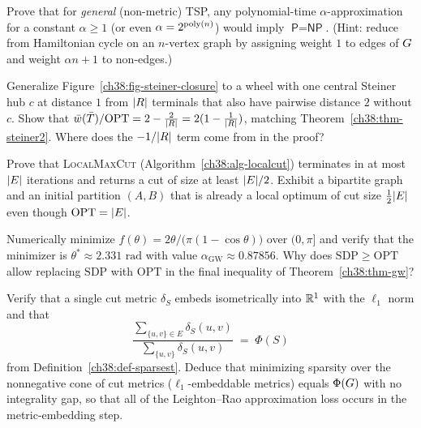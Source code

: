 \begin{exercise}\label{ch38:ex-tsp-nonmetric}
Prove that for \emph{general} (non-metric) TSP, any polynomial-time $\alpha$-approximation for a constant
$\alpha \ge 1$ (or even $\alpha = 2^{\operatorname{poly}(n)}$) would imply $\textsf{P}=\textsf{NP}$. (Hint: reduce from
Hamiltonian cycle on an $n$-vertex graph by assigning weight $1$ to edges of $G$ and weight $\alpha n + 1$
to non-edges.)
\end{exercise}

\begin{exercise}\label{ch38:ex-steiner-gap}
Generalize Figure~\ref{ch38:fig-steiner-closure} to a wheel with one central Steiner hub $c$ at distance $1$
from $\lvert R\rvert$ terminals that also have pairwise distance $2$ without $c$. Show that $\bar w(\bar T)/\mathrm{OPT}
= 2 - \tfrac{2}{\lvert R\rvert} = 2(1 - \tfrac{1}{\lvert R\rvert})$, matching Theorem~\ref{ch38:thm-steiner2}. Where does the
$-1/\lvert R\rvert$ term come from in the proof?
\end{exercise}

\begin{exercise}\label{ch38:ex-maxcut-half}
Prove that \textsc{LocalMaxCut} (Algorithm~\ref{ch38:alg-localcut}) terminates in at most $\lvert E\rvert$
iterations and returns a cut of size at least $\lvert E\rvert/2$. Exhibit a bipartite graph and an initial partition
$(A,B)$ that is already a local optimum of cut size $\tfrac12\lvert E\rvert$ even though $\mathrm{OPT}=\lvert E\rvert$.
\end{exercise}

\begin{exercise}\label{ch38:ex-gw-curve}
Numerically minimize $f(\theta)=2\theta/\bigl(\pi(1-\cos\theta)\bigr)$ over $(0,\pi]$ and verify that the
minimizer is $\theta^\ast\approx 2.331\text{ rad}$ with value $\alpha_{\mathrm{GW}}\approx 0.87856$. Why
does $\mathrm{SDP}\ge\mathrm{OPT}$ allow replacing $\mathrm{SDP}$ with $\mathrm{OPT}$ in the final inequality
of Theorem~\ref{ch38:thm-gw}?
\end{exercise}

\begin{exercise}\label{ch38:ex-cut-metric}
Verify that a single cut metric $\delta_S$ embeds isometrically into $\mathbb{R}^1$ with the $\ell_1$ norm and
that
\[
  \frac{\sum_{\{u,v\}\in E}\delta_S(u,v)}{\sum_{\{u,v\}}\delta_S(u,v)} \;=\; \Phi(S)
\]
from Definition~\ref{ch38:def-sparsest}. Deduce that minimizing sparsity over the nonnegative cone of cut
metrics ($\ell_1$-embeddable metrics) equals $\Phi(G)$ with no integrality gap, so that all of the
Leighton--Rao approximation loss occurs in the metric-embedding step.
\end{exercise}

